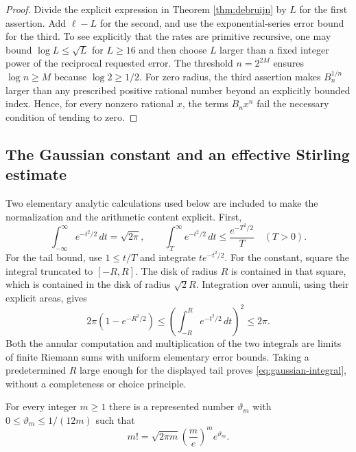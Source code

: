 \begin{proof}
Divide the explicit expression in Theorem \ref{thm:debruijn} by $L$
for the first assertion.  Add $\ell-L$ for the second, and use the
exponential-series error bound for the third.  To see explicitly that
the rates are primitive recursive, one may bound $\log L\leq\sqrt L$
for $L\geq16$ and then choose $L$ larger than a fixed integer power of
the reciprocal requested error.  The threshold $n=2^{2M}$ ensures
$\log n\geq M$ because $\log2\geq1/2$.
For zero radius, the third assertion makes $B_n^{1/n}$ larger than
any prescribed positive rational number beyond an explicitly bounded
index.  Hence, for every nonzero rational $x$, the terms $B_nx^n$
fail the necessary condition of tending to zero.
\end{proof}

\subsection{The Gaussian constant and an effective Stirling estimate}

Two elementary analytic calculations used below are included to make
the normalization and the arithmetic content explicit.  First,
\begin{equation}\label{eq:gaussian-integral}
 \int_{-\infty}^{\infty}e^{-t^2/2}\,dt=\sqrt{2\pi},\qquad
 \int_T^\infty e^{-t^2/2}\,dt\leq\frac{e^{-T^2/2}}T
 \quad(T>0).
\end{equation}
For the tail bound, use $1\leq t/T$ and integrate
$t e^{-t^2/2}$.  For the constant, square the integral truncated to
$[-R,R]$.  The disk of radius $R$ is contained in that square, which
is contained in the disk of radius $\sqrt2R$.  Integration over
annuli, using their explicit areas, gives
\[
 2\pi(1-e^{-R^2/2})
 \leq\left(\int_{-R}^R e^{-t^2/2}\,dt\right)^2
 \leq2\pi.
\]
Both the annular computation and multiplication of the two integrals
are limits of finite Riemann sums with uniform elementary error
bounds.  Taking a predetermined $R$ large enough for the displayed
tail proves \eqref{eq:gaussian-integral}, without a completeness or
choice principle.

\begin{lemma}
\label{lem:stirling-effective}
For every integer $m\geq1$ there is a represented number
$\vartheta_m$ with $0\leq\vartheta_m\leq1/(12m)$ such that
\begin{equation}\label{eq:stirling-effective}
 m!=\sqrt{2\pi m}\left(\frac me\right)^m e^{\vartheta_m}.
\end{equation}
\end{lemma}

